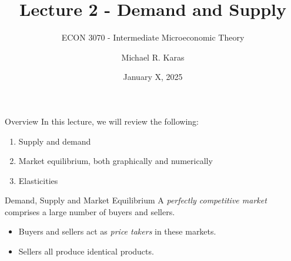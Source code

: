 \documentclass[12pt,t]{beamer}
\author{Michael R. Karas}
\title{Lecture 2 - Demand and Supply}
\subtitle{ECON 3070 - Intermediate Microeconomic Theory}
\date{January X, 2025}
\begin{document}
\begin{frame}
  \titlepage
\end{frame}

\begin{frame}{Overview}
  In this lecture, we will review the following:
  \begin{enumerate}
    \item Supply and demand

    \item Market equilibrium, both graphically and numerically

    \item Elasticities
  \end{enumerate}
\end{frame}

\begin{frame}{Demand, Supply and Market Equilibrium}
  A \textit{perfectly competitive market} comprises a large number of buyers and sellers.
  \begin{itemize}
    \item Buyers and sellers act as \textit{price takers} in these markets.
    \item Sellers all produce identical products.
  \end{itemize}
\end{frame}
\end{document}
